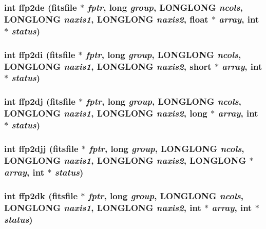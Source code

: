 \subsubsection{\setlength{\rightskip}{0pt plus 5cm}int ffp2de (\bf{fitsfile} $\ast$ {\em fptr}, long {\em group}, \bf{LONGLONG} {\em ncols}, \bf{LONGLONG} {\em naxis1}, \bf{LONGLONG} {\em naxis2}, float $\ast$ {\em array}, int $\ast$ {\em status})}\label{fitsio_8h_d22120fc89698ea1c5d54ec66c038dce}


\subsubsection{\setlength{\rightskip}{0pt plus 5cm}int ffp2di (\bf{fitsfile} $\ast$ {\em fptr}, long {\em group}, \bf{LONGLONG} {\em ncols}, \bf{LONGLONG} {\em naxis1}, \bf{LONGLONG} {\em naxis2}, short $\ast$ {\em array}, int $\ast$ {\em status})}\label{fitsio_8h_0fa81f7a8cdf97afcb174e6dc024f080}


\subsubsection{\setlength{\rightskip}{0pt plus 5cm}int ffp2dj (\bf{fitsfile} $\ast$ {\em fptr}, long {\em group}, \bf{LONGLONG} {\em ncols}, \bf{LONGLONG} {\em naxis1}, \bf{LONGLONG} {\em naxis2}, long $\ast$ {\em array}, int $\ast$ {\em status})}\label{fitsio_8h_bedbc492a2862dcbe85415d0f5963a92}


\subsubsection{\setlength{\rightskip}{0pt plus 5cm}int ffp2djj (\bf{fitsfile} $\ast$ {\em fptr}, long {\em group}, \bf{LONGLONG} {\em ncols}, \bf{LONGLONG} {\em naxis1}, \bf{LONGLONG} {\em naxis2}, \bf{LONGLONG} $\ast$ {\em array}, int $\ast$ {\em status})}\label{fitsio_8h_e377ad35a13d57c75f0f3e0f27be7e39}


\subsubsection{\setlength{\rightskip}{0pt plus 5cm}int ffp2dk (\bf{fitsfile} $\ast$ {\em fptr}, long {\em group}, \bf{LONGLONG} {\em ncols}, \bf{LONGLONG} {\em naxis1}, \bf{LONGLONG} {\em naxis2}, int $\ast$ {\em array}, int $\ast$ {\em status})}\label{fitsio_8h_5cd35b8cecc698e509678e88cff3c92c}


